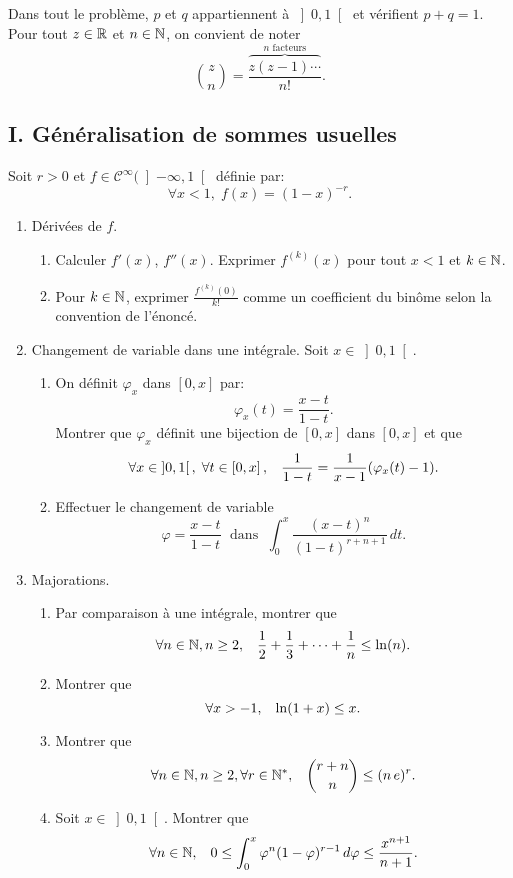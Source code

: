 \noindent
Dans tout le problème, $p$ et $q$ appartiennent à $\left] 0,1 \right[$ et vérifient $p+q = 1$.\newline
Pour tout $z \in \mathbb{R}$ et $n\in \mathbb{N}$, on convient de noter 
\[
  \binom{z}{n} = \frac{\overset{n \text{ facteurs}}{\overbrace{z(z-1)\cdots}}}{n!}.
\]

\subsection*{I. Généralisation de sommes usuelles}\noindent
Soit $r>0$ et $f \in \mathcal{C}^{\infty}(\left] - \infty, 1 \right[$ définie par:
\[
  \forall x < 1,\; f(x) = (1-x)^{-r}.
\]
\begin{enumerate}
  \item Dérivées de $f$.
  \begin{enumerate}
    \item Calculer $f'(x)$, $f''(x)$. Exprimer $f^{(k)}(x)$ pour tout $x < 1$ et $k \in \mathbb{N}$.
    \item Pour $k \in \mathbb{N}$, exprimer $\frac{f^{(k)}(0)}{k!}$ comme un coefficient du binôme selon la convention de l'énoncé.
  \end{enumerate}

  \item Changement de variable dans une intégrale. Soit $x \in \left] 0, 1 \right[$. 
  \begin{enumerate}
    \item On définit $\varphi_x$ dans $\left[ 0, x \right]$ par:
\[
  \varphi_x(t) = \frac{x-t}{1-t}.
\]
Montrer que $\varphi_x$ définit une bijection de $\left[ 0, x \right]$ dans $\left[ 0, x \right]$ et que
\[
  \forall x \in \left] 0, 1 \right[, \; \forall t \in \left[ 0,x \right], \hspace{0.3cm}
  \frac{1}{1-t} = \frac{1}{x-1}(\varphi_x(t)-1).
\]
    \item Effectuer le changement de variable
\[
  \varphi = \frac{x - t}{1 - t} \;\text{ dans }\; \int_0^x \frac{(x-t)^n}{(1-t)^{r+n+1}}\, dt.
\]
  \end{enumerate}


  \item Majorations.
  \begin{enumerate}
    \item Par comparaison à une intégrale, montrer que
\[
  \forall n \in \mathbb{N}, n\geq 2, \hspace{0.3cm} \frac{1}{2} + \frac{1}{3} + \cdots + \frac{1}{n} \leq \ln(n).
\]
    \item Montrer que 
\[
  \forall x > -1, \hspace{0.3cm} \ln(1+x) \leq x.
\]
    \item Montrer que
\[
  \forall n \in \mathbb{N}, n\geq 2, \forall r \in \mathbb{N}^*, \hspace{0.3cm}\binom{r+n}{n} \leq (n\,e)^r.
\]
    \item Soit $x \in \left] 0, 1 \right[$. Montrer que 
\[
  \forall n \in \mathbb{N},\hspace{0.3cm} 0 \leq \int_0^x \varphi^n(1-\varphi)^{r-1}\,d\varphi \leq \frac{x^{n+1}}{n+1}.
\]
  \end{enumerate}


\end{enumerate}
